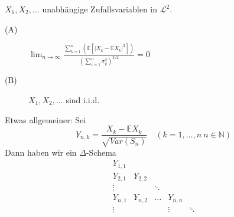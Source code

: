 \documentclass[10pt,a4paper]{report}
\numberwithin{equation}{section}
\numberwithin{figure}{section}
\theoremstyle{plain}
\theoremstyle{definition}
\theoremstyle{remark}
\theoremstyle{plain}
\newcommand{\1}{ \mathbb{1} } %
\begin{document}
 $X_{1},X_{2},\ldots$ unabhängige
Zufallsvariablen in $\mathcal{L}^{2}$.
\begin{description}
\item [{(A)}] $\lim_{n\to\infty}\frac{\sum_{k=1}^{n}\left(\mathbb{E}\left[\left|X_{k}-\mathbb{E}X_{k}\right|^{3}\right]\right)}{\left(\sum_{i=1}^{n}\sigma_{k}^{2}\right)^{3/2}}=0$
\item [{(B)}] $X_{1},X_{2},\ldots$ sind i.i.d. 
\end{description}
Etwas allgemeiner: Sei 
\[
Y_{n,k}=\frac{X_{k}-\mathbb{E}X_{k}}{\sqrt{Var\left(S_{n}\right)}}\quad\left(k=1,\ldots,n\ n\in\mathbb{N}\right)
\]
Dann haben wir ein $\varDelta$-Schema 
\[
\begin{matrix}Y_{1,1}\\
Y_{2,1} & Y_{2,2}\\
\vdots &  & \ddots\\
Y_{n,1} & Y_{n,2} & \ldots & Y_{n,n}\\
\vdots &  &  & \vdots & \ddots
\end{matrix}
\]
 
\end{document}
